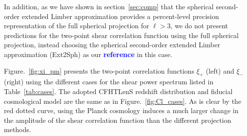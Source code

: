 \documentclass[fleqn,usenatbib]{mnras} %
\newcommand{\mk}[1]{{\bf\textcolor{blue}{#1}}}
\begin{document}
In addition, as we have shown in section~\ref{sec:comp} that the spherical
second-order extended Limber approximation provides a percent-level precision
representation of the full spherical projection for $\ell > 3$, we do not
present predictions for the two-point shear correlation function using the full
spherical projection, instead choosing the spherical second-order extended
Limber approximation (Ext2Sph) as our \mk{reference} in this case.

Figure.~\ref{fig:xi_pm} presents the two-point correlation functions
$\xi_+$ (left) and $\xi_-$ (right) using the different cases for the shear
power spectrum listed in Table~\ref{tab:cases}. The adopted CFHTLenS redshift
distribution and fiducial cosmological model are the same as in
Figure.~\ref{fig:Cl_cases}. As is clear by the red dotted curve, using the
Planck cosmology \citep{2015arXiv150201589P} induces a much larger change in
the amplitude of the shear correlation function than the different projection
methods.
\end{document}
